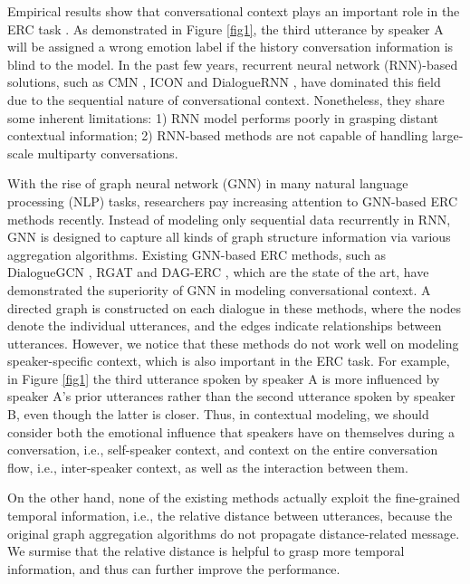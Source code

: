 \documentclass[letterpaper]{article} \usepackage{aaai22}  \usepackage{times}  \usepackage{helvet}  \usepackage{courier}  \usepackage[hyphens]{url}  \usepackage{graphicx} \urlstyle{rm} \def\UrlFont{\rm}  \usepackage{natbib}  \usepackage{caption} \DeclareCaptionStyle{ruled}{labelfont=normalfont,labelsep=colon,strut=off} \frenchspacing  \setlength{\pdfpagewidth}{8.5in}  \setlength{\pdfpageheight}{11in}  \usepackage{algorithm}
\begin{document}
Empirical results show that conversational context plays an important role in the ERC task \cite{poria2019emotion}.
As demonstrated in Figure \ref{fig1}, the third utterance by speaker A will be assigned a wrong emotion label if the history conversation information is blind to the model.  In the past few years, recurrent neural network (RNN)-based solutions, such as CMN \cite{cmn}, ICON \cite{icon} and DialogueRNN \cite{dialoguernn}, have dominated this field due to the sequential nature of conversational context. Nonetheless, they share some inherent limitations: 1) RNN model performs poorly in grasping distant contextual information; 2) RNN-based methods are not capable of handling large-scale multiparty conversations. 



With the rise of graph neural network (GNN) \cite{wu2020comprehensive} in many natural language processing (NLP) tasks, researchers pay increasing attention to GNN-based ERC methods recently. Instead of modeling only sequential data recurrently in RNN, GNN is designed to capture all kinds of graph structure information via various aggregation algorithms. Existing GNN-based ERC methods, such as DialogueGCN \cite{dialoguegcn}, RGAT \cite{rgat} and DAG-ERC \cite{dag}, which are the state of the art, have demonstrated the superiority of GNN in modeling conversational context. A directed graph is constructed on each dialogue in these methods, where the nodes denote the individual utterances, and the edges indicate relationships between utterances. However, we notice that these methods do not work well on modeling speaker-specific context, which is also important in the ERC task. For example, in Figure \ref{fig1} the third utterance spoken by speaker A is more influenced by speaker A's prior utterances rather than the second utterance spoken by speaker B, even though the latter is closer. Thus, in contextual modeling, we should consider both the emotional influence that speakers have on themselves during a conversation, i.e., self-speaker context, and context on the entire conversation flow, i.e., inter-speaker context, as well as the interaction between them.

On the other hand, none of the existing methods actually exploit the fine-grained temporal information, i.e., the relative distance between utterances, because the original graph aggregation algorithms do not propagate distance-related message. We surmise that the relative distance is helpful to grasp more temporal information, and thus can further improve the performance.
\end{document}
